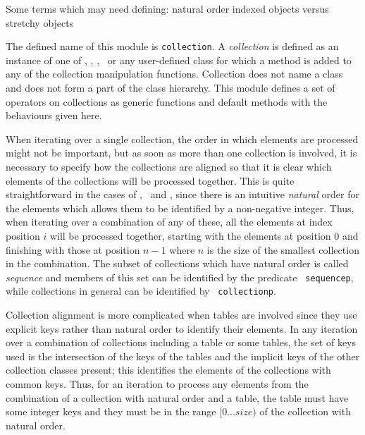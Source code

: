 \label{collection}
%
\begin{optPrivate}
    Some terms which may need defining: natural order indexed objects versus
    stretchy objects
\end{optPrivate}
%
\begin{optDefinition}
%
The defined name of this module is {\tt collection}.  A {\em collection\/} is
defined as an instance of one of , ,
, \ or any user-defined class for which a
method is added to any of the collection manipulation functions.  Collection
does not name a class and does not form a part of the class hierarchy.  This
module defines a set of operators on collections as generic functions and
default methods with the behaviours given here.

When iterating over a single collection, the order in which elements are
processed might not be important, but as soon as more than one collection is
involved, it is necessary to specify how the collections are
aligned so that it is clear which elements
of the collections will be processed together.  This is quite straightforward in
the cases of , \ and , since
there is an intuitive {\em natural\/} order for the elements which allows them
to be identified by a non-negative integer.  Thus, when iterating over a
combination of any of these, all the elements at index position $i$ will be
processed together, starting with the elements at position $0$ and finishing
with those at position $n-1$ where $n$ is the size of the smallest collection in
the combination.  The subset of collections which have natural order is called
{\em sequence\/} and members of this set can be identified by the predicate {\tt
    sequencep}, while collections in general can be identified by {\tt
    collectionp}.

Collection alignment is more complicated when tables are involved since they use
explicit keys rather than natural order to identify their elements.  In any
iteration over a combination of collections including a table or some tables,
the set of keys used is the intersection of the keys of the tables and the
implicit keys of the other collection classes present; this identifies the
elements of the collections with common keys.  Thus, for an iteration to process
any elements from the combination of a collection with natural order and a
table, the table must have some integer keys and they must be in the range
$[0\ldots{}size)$ of the collection with natural order.


\end{optDefinition}
